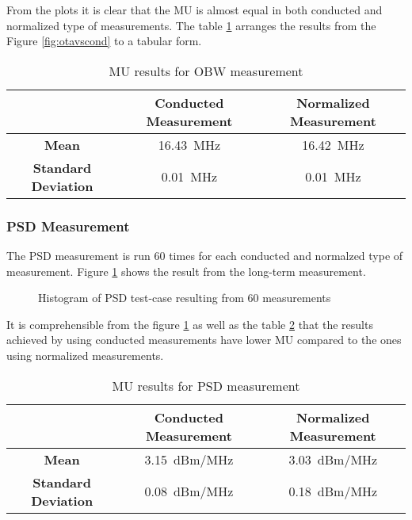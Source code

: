 From the plots it is clear that the \acf{MU} is almost equal in both conducted and normalized type of measurements. The table \ref{tab:tab1} arranges the results from the Figure \ref{fig:otavscond} to a tabular form. 

\begin{table}[H]
  \centering
\begin {tabular} {|c|c|c|} 
\toprule
 & \textbf{Conducted Measurement} & \textbf{Normalized Measurement} \\ 
\midrule 
\textbf{Mean} & 16.43~MHz & 16.42~MHz\\
\textbf{Standard Deviation} & 0.01~MHz & 0.01~MHz\\
\bottomrule
 \end{tabular}
  \caption{\acf{MU} results for \acs{OBW} measurement} \label{tab:tab1}
\end{table}

\subsubsection{\acf{PSD} Measurement}
The \acs{PSD} measurement is run 60 times for each conducted and normalzed type of measurement. Figure
\ref{fig:otavscond2} shows the result from the long-term measurement.
\begin{figure}[H]
\centering
{}
\caption{Histogram of \acs{PSD} test-case resulting from 60 measurements }
\label{fig:otavscond2} 
\end{figure}
It is comprehensible from the figure \ref{fig:otavscond2} as well as the table \ref{tab:tab2} that the results achieved by using conducted measurements have lower \acs{MU} compared to the ones using normalized measurements.
\begin{table}[H]
  \centering
\begin {tabular} {|c|c|c|} 
\toprule
 & \textbf{Conducted Measurement} & \textbf{Normalized Measurement} \\ 
\midrule 
\textbf{Mean} & 3.15~dBm/MHz & 3.03~dBm/MHz\\
\textbf{Standard Deviation} & 0.08~dBm/MHz & 0.18~dBm/MHz\\
\bottomrule
 \end{tabular}
  \caption{\acf{MU} results for \acs{PSD} measurement} \label{tab:tab2}
\end{table}


